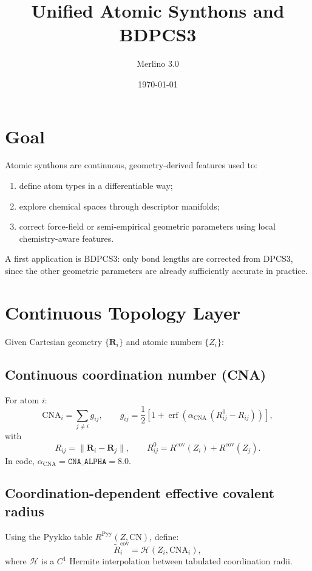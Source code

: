 \documentclass[a4paper,11pt]{article}
\title{Unified Atomic Synthons and BDPCS3}
\author{Merlino 3.0}
\date{\today}
\begin{document}
\maketitle

\section{Goal}
Atomic synthons are continuous, geometry-derived features used to:
\begin{enumerate}
\item define atom types in a differentiable way;
\item explore chemical spaces through descriptor manifolds;
\item correct force-field or semi-empirical geometric parameters using local chemistry-aware features.
\end{enumerate}

A first application is BDPCS3: only bond lengths are corrected from DPCS3, since the other geometric parameters are already sufficiently accurate in practice.

\section{Continuous Topology Layer}
Given Cartesian geometry $\{\mathbf{R}_i\}$ and atomic numbers $\{Z_i\}$:

\subsection{Continuous coordination number (CNA)}
For atom $i$:
\begin{equation}
\mathrm{CNA}_i = \sum_{j\neq i} g_{ij},
\qquad
g_{ij} = \frac{1}{2}\left[1+\operatorname{erf}\!\left(\alpha_{\mathrm{CNA}}\,(R^0_{ij}-R_{ij})\right)\right],
\end{equation}
with
\begin{equation}
R_{ij}=\lVert \mathbf{R}_i-\mathbf{R}_j\rVert,
\qquad
R^0_{ij}=R^{\mathrm{cov}}(Z_i)+R^{\mathrm{cov}}(Z_j).
\end{equation}
In code, $\alpha_{\mathrm{CNA}}=\texttt{CNA\_ALPHA}=8.0$.

\subsection{Coordination-dependent effective covalent radius}
Using the Pyykko table $R^{\mathrm{Pyy}}(Z,\mathrm{CN})$, define:
\begin{equation}
\tilde R^{\mathrm{cov}}_i = \mathcal{H}\!\left(Z_i,\mathrm{CNA}_i\right),
\end{equation}
where $\mathcal{H}$ is a $C^1$ Hermite interpolation between tabulated coordination radii.
\end{document}
